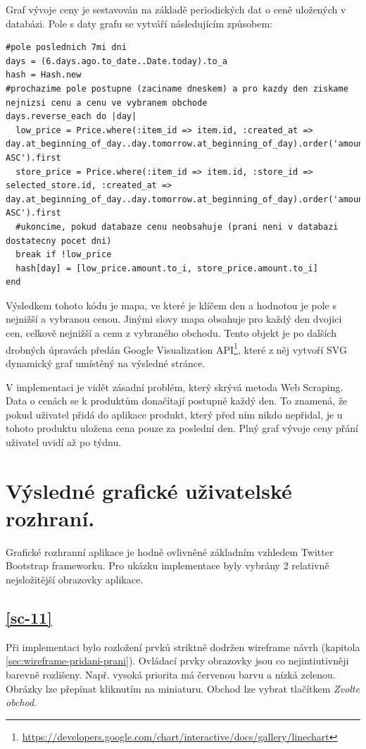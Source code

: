 Graf vývoje ceny je sestavován na základě periodických dat o ceně uložených v databázi. Pole s daty grafu se vytváří následujícím způsobem: 
\begin{lstlisting}
#pole poslednich 7mi dni
days = (6.days.ago.to_date..Date.today).to_a
hash = Hash.new
#prochazime pole postupne (zaciname dneskem) a pro kazdy den ziskame nejnizsi cenu a cenu ve vybranem obchode
days.reverse_each do |day|
  low_price = Price.where(:item_id => item.id, :created_at => day.at_beginning_of_day..day.tomorrow.at_beginning_of_day).order('amount ASC').first
  store_price = Price.where(:item_id => item.id, :store_id => selected_store.id, :created_at => day.at_beginning_of_day..day.tomorrow.at_beginning_of_day).order('amount ASC').first
  #ukoncime, pokud databaze cenu neobsahuje (prani neni v databazi dostatecny pocet dni)
  break if !low_price
  hash[day] = [low_price.amount.to_i, store_price.amount.to_i]
end
\end{lstlisting}

Výsledkem tohoto kódu je mapa, ve které je klíčem den a hodnotou je pole s nejnižší a vybranou cenou. Jinými slovy mapa obsahuje pro každý den dvojici cen, celkově nejnižší a cenu z vybraného obchodu. Tento objekt je po dalších drobných úpravách předán Google Visualization API\footnote{\url{https://developers.google.com/chart/interactive/docs/gallery/linechart}}, které z něj vytvoří SVG dynamický graf umístěný na výsledné stránce.

V implementaci je vidět zásadní problém, který skrývá metoda Web Scraping. Data o cenách se k produktům donačítají postupně každý den. To znamená, že pokud uživatel přidá do aplikace produkt, který před ním nikdo nepřidal, je u tohoto produktu uložena cena pouze za poslední den. Plný graf vývoje ceny přání uživatel uvidí až po týdnu.

\section{Výsledné grafické uživatelské rozhraní.}
Grafické rozhranní aplikace je hodně ovlivněné základním vzhledem Twitter Bootstrap frameworku. Pro ukázku implementace byly vybrány 2 relativně nejsložitější obrazovky aplikace.
\subsection{\ref{sc-11}}
Při implementaci bylo rozložení prvků striktně dodržen wireframe návrh (kapitola \ref{sec:wireframe-pridani-prani}). Ovládací prvky obrazovky jsou co nejintiutivněji barevně rozlišeny. Např. vysoká priorita má červenou barvu a nízká zelenou. Obrázky lze přepínat kliknutím na miniaturu. Obchod lze vybrat tlačítkem \emph{Zvolte obchod}.

